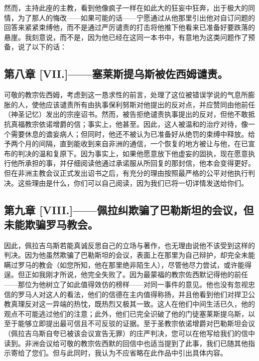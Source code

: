然而，主持此座的主教，看到他像疯子一样在如此大的狂妄中狂奔，出于极大的同情，为了那人的悔改——如果可能的话——宁愿通过从他那里引出他对自订问题的回答来紧紧束缚他，而不是通过严厉谴责的打击将他推下他看来已准备好要跌落的悬崖。我刻意说，而不是，因为他已经在这同一本书中，有意地为这类问题作了预备，说了以下的话：\par


\subsection{第八章 [VII.]——塞莱斯提乌斯被佐西姆谴责。}

可敬的教宗佐西姆，考虑到这一恳求性的前言，处理了这位被错误学说的气息所膨胀的人，使他应该谴责所有由执事保利努斯对他提出的反对点，并应赞同由他前任（神圣记忆）发出的宗座诏书。然而，被告拒绝谴责执事提出的反对，但他不敢抵抗真福教宗依诺增爵的信；事实上，他甚至。因此，这人被温和的治疗对待，像一个需要休息的谵妄病人；但同时，他还不被认为已准备好从绝罚的束缚中释放。给予两个月的间隔，直到能收到来自非洲的通信，一个恢复的地方被让与他，在已宣布的判决的温和复原下。因为事实上，如果他愿意放下他虚妄的固执，现在愿意执行他所承担的事，并仔细阅读他通过承诺服从所回复的那封信，他本会变得更好。但在非洲主教会议正式发出诏书之后，有充分的理由按照最严格的公平对他执行判决。这些理由是什么，你们可以自己阅读，因为我们已将一切详情发送给你们。\par


\subsection{第九章 [VIII.]——佩拉纠欺骗了巴勒斯坦的会议，但未能欺骗罗马教会。}

因此，佩拉吉乌斯若能真诚反思自己的立场与著作，也无理由说他不该受到这样的判决。因为他虽然欺骗了巴勒斯坦的会议，表面上在那里为自己辩护，却完全未能瞒过罗马的教会（如您所知，他在那里绝非陌生人），尽管他尽力尝试，或许能得逞。但正如我刚才所说，他完全失败了。因为最蒙福的教宗佐西默记得他的前任——那位为他树立了如此值得效仿的榜样——对同一事件的意见。他也没有忽视忠信的罗马人对这人的看法，他们的信德在主内值得称扬，并且他看到他们对捍卫公教真理反对这一异端的热忱，既热烈又极其一致。这人在他们中间生活已久，他的观点不可能逃过他们的注意；此外，他们已完全识破了他的门徒塞莱斯提乌斯，以至于能够立即提出最可信且不可反驳的证据。至于圣教宗依诺增爵对巴勒斯坦会议（佩拉吉乌斯自夸已被该会议宣告无罪）的庄严判决，您可以在他写给我们的信中读到。非洲会议给可敬的教宗佐西默的回信中也适当提到了此事，我们已随其他指示寄给了您们。但与此同时，我认为不应省略在此作品中引出具体内容。\par

